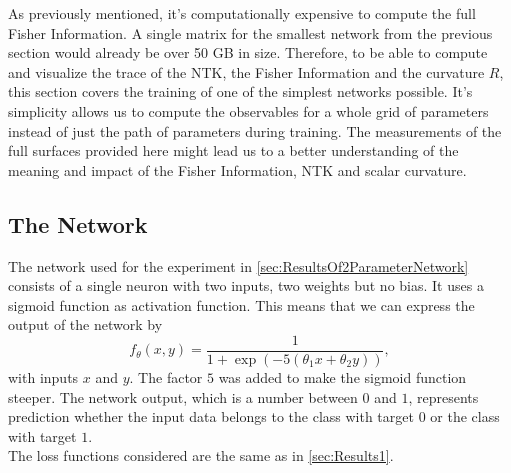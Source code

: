 As previously mentioned, it's computationally expensive to compute the full Fisher Information. A single matrix for the smallest network from the previous section would already be over 50 GB in size. Therefore, to be able to compute and visualize the trace of the NTK, the Fisher Information and the curvature $R$, this section covers the training of one of the simplest networks possible. It's simplicity allows us to compute the observables for a whole grid of parameters instead of just the path of parameters during training. The measurements of the full surfaces provided here might lead us to a better understanding of the meaning and impact of the Fisher Information, NTK and scalar curvature.

\subsection{The Network}
The network used for the experiment in \cref{sec:ResultsOf2ParameterNetwork} consists of a single neuron with two inputs, two weights but no bias. It uses a sigmoid function \cite{ActivationFunctionOverview} as activation function. This means that we can express the output of the network by 
\begin{equation}\label{eq:Results2Sigmoid}
	f_\theta(x,y) = \frac{1}{1+ \exp (-5(\theta_1 x + \theta_2 y))},
\end{equation}
with inputs $x$ and $y$. The factor $5$ was added to make the sigmoid function steeper. The network output, which is a number between $0$ and $1$, represents prediction whether the input data belongs to the class with target $0$ or the class with target $1$.\\
The loss functions considered are the same as in \cref{sec:Results1}.

